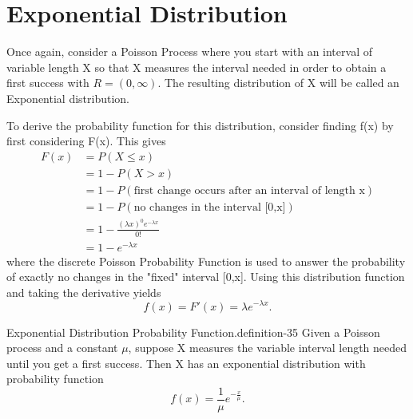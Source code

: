 \documentclass[10pt,]{book}
\numberwithin{equation}{section}
\newcommand{\gt}{>}
\begin{document}
\section[{Exponential Distribution}]{Exponential Distribution}\label{section-53}
\hypertarget{p-1066}{}%
Once again, consider a Poisson Process where you start with an interval of variable length X so that X measures the interval needed in order to obtain a first success with \(R = (0,\infty)\). The resulting distribution of X will be called an Exponential distribution.%
\par
\hypertarget{p-1067}{}%
To derive the probability function for this distribution, consider finding f(x) by first considering F(x). This gives%
\begin{align*}
F(x)&  = P(X \le x)\\
& = 1 - P(X \gt x)\\
& = 1 - P(\text{first change occurs after an interval of length x})\\
& = 1 - P(\text{no changes in the interval [0,x]})\\
& = 1 - \frac{(\lambda x)^0 e^{-\lambda x}}{0!}\\
& = 1 - e^{-\lambda x}
\end{align*}
where the discrete Poisson Probability Function is used to answer the probability of exactly no changes in the "fixed" interval [0,x]. Using this distribution function and taking the derivative yields%
\begin{equation*}
f(x) = F'(x) = \lambda e^{-\lambda x}.
\end{equation*}
%
\par
\hypertarget{p-1068}{}%
\begin{definition}{Exponential Distribution Probability Function.}{definition-35}%
\hypertarget{p-1069}{}%
Given a Poisson process and a constant \(\mu\), suppose X measures the variable interval length needed until you get a first success.  Then X has an exponential distribution with probability function%
\begin{equation*}
f(x) = \frac{1}{\mu} e^{-\frac{x}{\mu}}.
\end{equation*}
%
\end{definition}
%
\par
\hypertarget{p-1070}{}%
\end{document}
